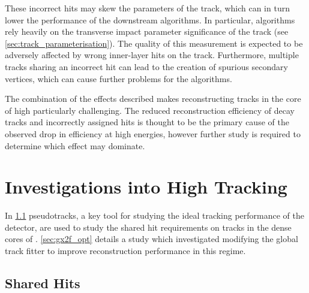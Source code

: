 These incorrect hits may skew the parameters of the track, which can in turn lower the performance of the downstream \btagging algorithms.
In particular, \btagging algorithms rely heavily on the transverse impact parameter significance \dzerosig of the track (see \cref{sec:track_parameterisation}).
The quality of this measurement is expected to be adversely affected by wrong inner-layer hits on the track.
Furthermore, multiple tracks sharing an incorrect hit can lead to the creation of spurious secondary vertices, which can cause further problems for the \btagging algorithms.

The combination of the effects described makes reconstructing tracks in the core of high \pT \bjets particularly challenging.
The reduced reconstruction efficiency of \bhadron decay tracks and incorrectly assigned hits is thought to be the primary cause of the observed drop in \btagging efficiency at high energies, however further study is required to determine which effect may dominate.



\section{Investigations into High \texorpdfstring{\pT}{pT} \bhadron Tracking}\label{sec:b_track_reco_improvements}

In \cref{sec:sharedhits} pseudotracks, a key tool for studying the ideal tracking performance of the \ATLAS detector, are used to study the shared hit requirements on tracks in the dense cores of \highpt \bjets.
\cref{sec:gx2f_opt} details a study which investigated modifying the global track fitter to improve reconstruction performance in this regime.


\subsection{Shared Hits}\label{sec:sharedhits}



